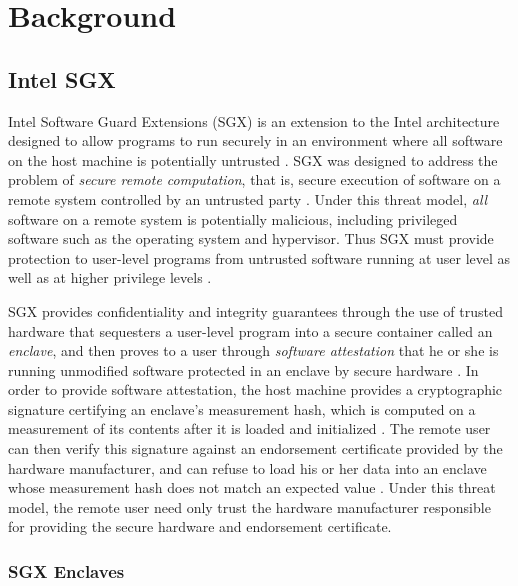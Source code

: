 \section{Background}

\subsection{Intel SGX}

Intel Software Guard Extensions (SGX) is an extension to the Intel architecture designed to allow programs to run securely in an environment where all software on the host machine is potentially untrusted \cite{intel_corporation_intel_2016}. SGX was designed to address the problem of \emph{secure remote computation}, that is, secure execution of software on a remote system controlled by an untrusted party \cite{intel_corporation_intel_2016}. Under this threat model, \emph{all} software on a remote system is potentially malicious, including privileged software such as the operating system and hypervisor. Thus SGX must provide protection to user-level programs from untrusted software running at user level as well as at higher privilege levels \cite{costan_intel_2016}. 

SGX provides confidentiality and integrity guarantees through the use of trusted hardware that sequesters a user-level program into a secure container called an \emph{enclave}, and then proves to a user through \emph{software attestation} that he or she is running unmodified software protected in an enclave by secure hardware \cite{intel_corporation_intel_2016}. In order to provide software attestation, the host machine provides a cryptographic signature certifying an enclave's measurement hash, which is computed on a measurement of its contents after it is loaded and initialized \cite{costan_intel_2016}. The remote user can then verify this signature against an endorsement certificate provided by the hardware manufacturer, and can refuse to load his or her data into an enclave whose measurement hash does not match an expected value \cite{intel_corporation_intel_2016, costan_intel_2016}. Under this threat model, the remote user need only trust the hardware manufacturer responsible for providing the secure hardware and endorsement certificate.

\subsubsection{SGX Enclaves}

